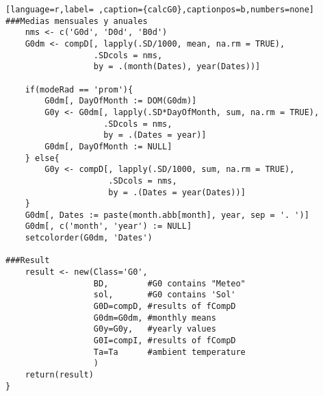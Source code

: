 \begin{lstlisting}[language=r,label= ,caption={calcG0},captionpos=b,numbers=none]
###Medias mensuales y anuales
    nms <- c('G0d', 'D0d', 'B0d')
    G0dm <- compD[, lapply(.SD/1000, mean, na.rm = TRUE),
                  .SDcols = nms,
                  by = .(month(Dates), year(Dates))]

    if(modeRad == 'prom'){
        G0dm[, DayOfMonth := DOM(G0dm)]
        G0y <- G0dm[, lapply(.SD*DayOfMonth, sum, na.rm = TRUE),
                    .SDcols = nms,
                    by = .(Dates = year)]
        G0dm[, DayOfMonth := NULL]        
    } else{
        G0y <- compD[, lapply(.SD/1000, sum, na.rm = TRUE),
                     .SDcols = nms,
                     by = .(Dates = year(Dates))]
    }
    G0dm[, Dates := paste(month.abb[month], year, sep = '. ')]
    G0dm[, c('month', 'year') := NULL]
    setcolorder(G0dm, 'Dates')

###Result
    result <- new(Class='G0',
                  BD,        #G0 contains "Meteo"
                  sol,       #G0 contains 'Sol'
                  G0D=compD, #results of fCompD
                  G0dm=G0dm, #monthly means
                  G0y=G0y,   #yearly values
                  G0I=compI, #results of fCompD
                  Ta=Ta      #ambient temperature
                  )
    return(result)
}
\end{lstlisting}
